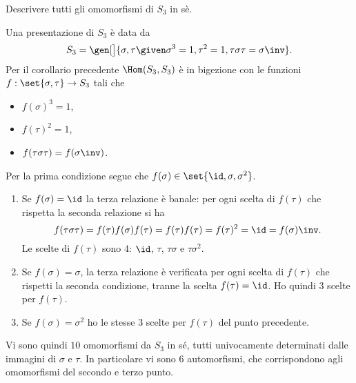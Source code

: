 \begin{exercise}
    Descrivere tutti gli omomorfismi di $S_3$ in sè.
\end{exercise}   
\begin{solution} 
    Una presentazione di $S_3$ è data da \[
        S_3 = \gen[\big]{\sigma, \tau \given \sigma^3 = 1, \tau^2 = 1, \tau\sigma\tau = \sigma\inv}.    
    \] Per il corollario precedente $\Hom(S_3, S_3)$ è in bigezione con le funzioni $f : \set{\sigma, \tau} \to S_3$ tali che \begin{itemize}
        \item $f(\sigma)^3 = 1$,
        \item $f(\tau)^2 = 1$,
        \item $f(\tau\sigma\tau) = f(\sigma\inv)$.
    \end{itemize}

    Per la prima condizione segue che $f(\sigma) \in \set{\id, \sigma, \sigma^2}$.
    \begin{enumerate}[label={(\roman*)}]
        \item Se $f(\sigma) = \id$ la terza relazione è banale: per ogni scelta di $f(\tau)$ che rispetta la seconda relazione si ha \[
            f(\tau\sigma\tau) = f(\tau)f(\sigma)f(\tau) = f(\tau)f(\tau) = f(\tau)^2 = \id = f(\sigma)\inv.
        \] Le scelte di $f(\tau)$ sono $4$: $\id$, $\tau$, $\tau\sigma$ e $\tau\sigma^2$.
        \item Se $f(\sigma) = \sigma$, la terza relazione è verificata per ogni scelta di $f(\tau)$ che rispetti la seconda condizione, tranne la scelta $f(\tau) = \id$. Ho quindi $3$ scelte per $f(\tau)$.
        \item Se $f(\sigma) = \sigma^2$ ho le stesse $3$ scelte per $f(\tau)$ del punto precedente.
    \end{enumerate}

    Vi sono quindi $10$ omomorfismi da $S_3$ in sé, tutti univocamente determinati dalle immagini di $\sigma$ e $\tau$. In particolare vi sono $6$ automorfismi, che corrispondono agli omomorfismi del secondo e terzo punto.
\end{solution}